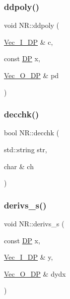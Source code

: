 \mbox{\label{namespaceNR_ad41cff50a7498a881df8034897f4fb51}} 
\subsubsection{\texorpdfstring{ddpoly()}{ddpoly()}}
{\footnotesize\ttfamily void N\+R\+::ddpoly (\begin{DoxyParamCaption}\item[{\mbox{\hyperlink{namespaceNR_a9f943da53862537c552e2a770cb170ae}{Vec\+\_\+\+I\+\_\+\+DP}} \&}]{c,  }\item[{const \mbox{\hyperlink{namespaceNR_af6ff762dd605ff477b8e52387253a02a}{DP}}}]{x,  }\item[{\mbox{\hyperlink{namespaceNR_a970094d23441f8ef6a45282a7eb2103d}{Vec\+\_\+\+O\+\_\+\+DP}} \&}]{pd }\end{DoxyParamCaption})}

\mbox{\label{namespaceNR_a8d6348025222a219a6ed25d9f2d2b3f4}} 
\subsubsection{\texorpdfstring{decchk()}{decchk()}}
{\footnotesize\ttfamily bool N\+R\+::decchk (\begin{DoxyParamCaption}\item[{std\+::string}]{str,  }\item[{char \&}]{ch }\end{DoxyParamCaption})}

\mbox{\label{namespaceNR_a42dd648242c5c48df166bfb2b2125d80}} 
\subsubsection{\texorpdfstring{derivs\_s()}{derivs\_s()}}
{\footnotesize\ttfamily void N\+R\+::derivs\+\_\+s (\begin{DoxyParamCaption}\item[{const \mbox{\hyperlink{namespaceNR_af6ff762dd605ff477b8e52387253a02a}{DP}}}]{x,  }\item[{\mbox{\hyperlink{namespaceNR_a9f943da53862537c552e2a770cb170ae}{Vec\+\_\+\+I\+\_\+\+DP}} \&}]{y,  }\item[{\mbox{\hyperlink{namespaceNR_a970094d23441f8ef6a45282a7eb2103d}{Vec\+\_\+\+O\+\_\+\+DP}} \&}]{dydx }\end{DoxyParamCaption})}

